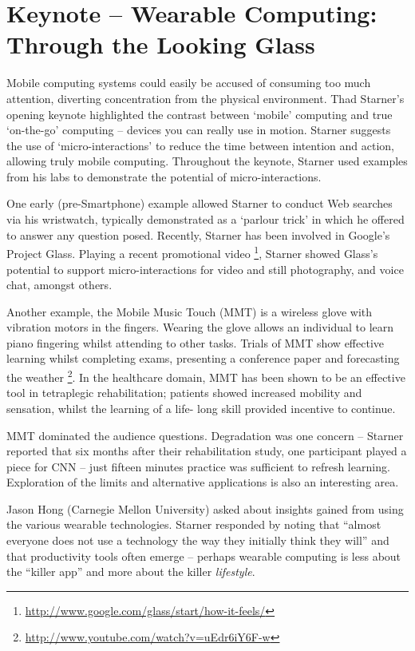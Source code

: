 \section{Keynote -- Wearable Computing: Through the Looking Glass}
\label{sec:keynote}
Mobile computing systems could easily be accused of consuming too much
attention, diverting concentration from the physical environment. Thad
Starner's opening keynote highlighted the contrast between `mobile'
computing and true `on-the-go' computing -- devices you can really use in
motion. Starner suggests the use of `micro-interactions' to reduce the time 
between intention and action, allowing truly mobile computing. Throughout the 
keynote, Starner used examples from his labs to demonstrate the potential of 
micro-interactions.


One early (pre-Smartphone) example allowed Starner to conduct Web searches 
via his wristwatch, typically demonstrated as a `parlour trick' in which 
he offered to answer any question posed. Recently, Starner has been involved in 
Google's Project Glass. Playing a recent promotional video 
\footnote{\url{http://www.google.com/glass/start/how-it-feels/}}, Starner showed 
Glass's potential to support micro-interactions for video and still 
photography, and voice chat, amongst others.

Another example, the Mobile Music Touch (MMT) is a wireless glove
with vibration motors in the fingers. Wearing the glove allows an individual to
learn piano fingering whilst attending to other tasks.
Trials of MMT show effective learning whilst completing exams, presenting a
conference paper and forecasting the weather
\footnote{\url{http://www.youtube.com/watch?v=uEdr6iY6F-w}}.
In the healthcare domain,
MMT has been shown to be an effective tool in tetraplegic rehabilitation; 
patients showed increased mobility and sensation, whilst the learning of a life-
long skill provided incentive to continue.

MMT dominated the audience questions. Degradation was one concern -- Starner 
reported that six months after their rehabilitation study, one participant played 
a piece for CNN -- just fifteen minutes practice was sufficient to refresh 
learning. Exploration of the limits and alternative applications is also an 
interesting area.

Jason Hong (Carnegie Mellon University) asked about insights gained from using
the various wearable technologies. Starner responded by noting that 
``almost everyone does not use a technology the way they initially 
think they will'' and that productivity tools often emerge -- perhaps wearable 
computing is less about the ``killer app'' and more about the killer 
\emph{lifestyle}.
